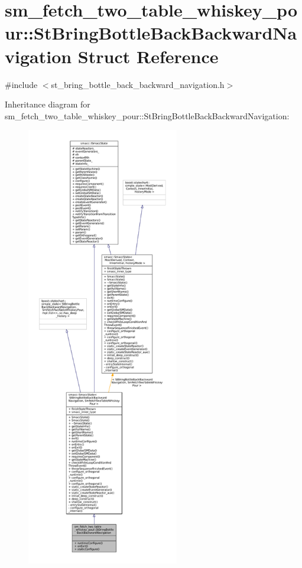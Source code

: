 \hypertarget{structsm__fetch__two__table__whiskey__pour_1_1StBringBottleBackBackwardNavigation}{}\section{sm\+\_\+fetch\+\_\+two\+\_\+table\+\_\+whiskey\+\_\+pour\+:\+:St\+Bring\+Bottle\+Back\+Backward\+Navigation Struct Reference}
\label{structsm__fetch__two__table__whiskey__pour_1_1StBringBottleBackBackwardNavigation}


{\ttfamily \#include $<$st\+\_\+bring\+\_\+bottle\+\_\+back\+\_\+backward\+\_\+navigation.\+h$>$}



Inheritance diagram for sm\+\_\+fetch\+\_\+two\+\_\+table\+\_\+whiskey\+\_\+pour\+:\+:St\+Bring\+Bottle\+Back\+Backward\+Navigation\+:
\nopagebreak
\begin{figure}[H]
\begin{center}
\leavevmode
\includegraphics[height=550pt]{structsm__fetch__two__table__whiskey__pour_1_1StBringBottleBackBackwardNavigation__inherit__graph}
\end{center}
\end{figure}


